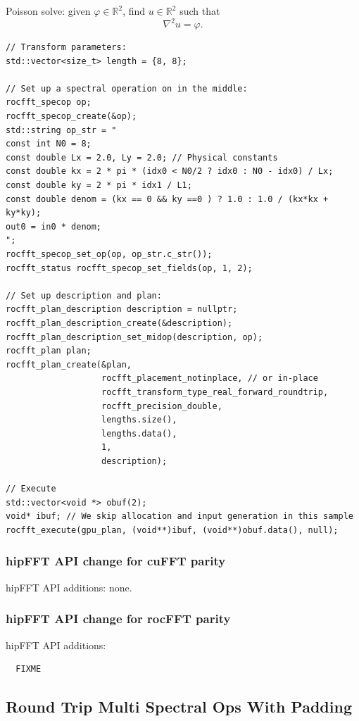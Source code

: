 \documentclass[12pt]{article}
\renewcommand{\(}{\left(}
\renewcommand{\)}{\right)}
\begin{document}
Poisson solve: given $\varphi\in\mathbb{R}^2$, find $u\in\mathbb{R}^2$ such
that
\begin{equation}
  \nabla^2 u = \varphi.
\end{equation}
\begin{lstlisting}
// Transform parameters:  
std::vector<size_t> length = {8, 8};

// Set up a spectral operation on in the middle:
rocfft_specop op;
rocfft_specop_create(&op);
std::string op_str = "
const int N0 = 8;
const double Lx = 2.0, Ly = 2.0; // Physical constants
const double kx = 2 * pi * (idx0 < N0/2 ? idx0 : N0 - idx0) / Lx;
const double ky = 2 * pi * idx1 / L1;
const double denom = (kx == 0 && ky ==0 ) ? 1.0 : 1.0 / (kx*kx + ky*ky);
out0 = in0 * denom;
";
rocfft_specop_set_op(op, op_str.c_str());
rocfft_status rocfft_specop_set_fields(op, 1, 2);

// Set up description and plan:
rocfft_plan_description description = nullptr;
rocfft_plan_description_create(&description);
rocfft_plan_description_set_midop(description, op);
rocfft_plan plan;
rocfft_plan_create(&plan,
                   rocfft_placement_notinplace, // or in-place
                   rocfft_transform_type_real_forward_roundtrip,
                   rocfft_precision_double,
                   lengths.size(),
                   lengths.data(),
                   1,
                   description);

// Execute
std::vector<void *> obuf(2);
void* ibuf; // We skip allocation and input generation in this sample
rocfft_execute(gpu_plan, (void**)ibuf, (void**)obuf.data(), null);
\end{lstlisting}


\subsubsection{hipFFT API change for cuFFT parity}

hipFFT API additions: none.

\subsubsection{hipFFT API change for rocFFT parity}
\noindent
hipFFT API additions:
\begin{lstlisting}
  FIXME
\end{lstlisting}

\newpage
\subsection{Round Trip Multi Spectral Ops With Padding}
\end{document}
